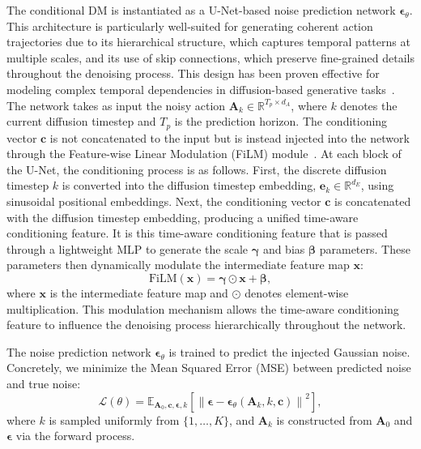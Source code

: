 \documentclass[final,5p,times,twocolumn]{elsarticle}
\begin{document}
The conditional DM is instantiated as a U-Net-based noise prediction network $\boldsymbol{\epsilon}_\theta$. This architecture is particularly well-suited for generating coherent action trajectories due to its hierarchical structure, which captures temporal patterns at multiple scales, and its use of skip connections, which preserve fine-grained details throughout the denoising process. This design has been proven effective for modeling complex temporal dependencies in diffusion-based generative tasks~\cite{chi2023diffusion}. The network takes as input the noisy action $\mathbf{A}_k \in \mathbb{R}^{T_p \times d_A}$, where $k$ denotes the current diffusion timestep and $T_p$ is the prediction horizon. The conditioning vector $ \mathbf{c} $ is not concatenated to the input but is instead injected into the network through the Feature-wise Linear Modulation (FiLM) module~\cite{perez2018film}. At each block of the U-Net, the conditioning process is as follows. First, the discrete diffusion timestep $k$ is converted into the diffusion timestep embedding, $\mathbf{e}_k \in \mathbb{R}^{d_E}$, using sinusoidal positional embeddings. Next, the conditioning vector $ \mathbf{c} $ is concatenated with the diffusion timestep embedding, producing a unified time-aware conditioning feature. It is this time-aware conditioning feature that is passed through a lightweight MLP to generate the scale $ \boldsymbol{\gamma} $ and bias $\boldsymbol{\beta}$ parameters. These parameters then dynamically modulate the intermediate feature map $\mathbf{x}$:
\begin{equation}
    \text{FiLM}(\mathbf{x}) = \boldsymbol{\gamma} \odot \mathbf{x} + \boldsymbol{\beta},
\end{equation}
where $ \mathbf{x} $ is the intermediate feature map and $ \odot $ denotes element-wise multiplication. This modulation mechanism allows the time-aware conditioning feature to influence the denoising process hierarchically throughout the network.

The noise prediction network $\boldsymbol{\epsilon}_\theta$ is trained to predict the injected Gaussian noise. Concretely, we minimize the Mean Squared Error (MSE) between predicted noise and true noise:
\begin{equation}
    \mathcal{L}(\theta) = 
    \mathbb{E}_{\mathbf{A}_0, \mathbf{c}, \boldsymbol{\epsilon}, k}
    \left[
      \left\| 
        \boldsymbol{\epsilon} - \boldsymbol{\epsilon}_\theta(\mathbf{A}_k, k, \mathbf{c})
      \right\|^2
    \right],
\end{equation}
where $k$ is sampled uniformly from $\{1, \dots, K\}$, and $\mathbf{A}_k$ is constructed from $\mathbf{A}_0$ and $\boldsymbol{\epsilon}$ via the forward process.
\end{document}
